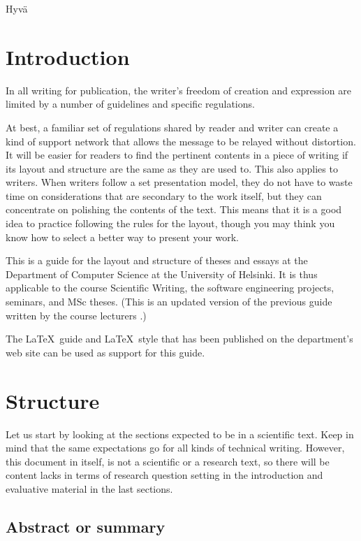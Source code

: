 Hyvä 
\chapter{Introduction}


In all writing for publication, the writer's freedom of creation and expression are limited by a number of guidelines and specific regulations.

At best, a familiar set of regulations shared by reader and writer can create a kind of support network that allows the message to be relayed without distortion. It will be easier for readers to find 
the pertinent contents in a piece of writing if its layout and structure are the same as they are used to. This also applies to writers. When writers follow a set presentation model, 
they do not have to waste time on considerations that are secondary to the work itself, but they can concentrate on polishing the contents of the text. This means that it is a good 
idea to practice following the rules for the layout, though you may think you know how to select a better way to present your work.

This is a guide for the layout and structure of theses and essays at the Department of Computer Science at the University of Helsinki. It is thus applicable to the course 
Scientific Writing, the software engineering projects, seminars, and MSc theses. (This is an updated version of 
the previous guide written by the course lecturers \citep{erkio01, erkiomakela96, erkio94, verkamo92}.)

The \LaTeX\ guide and \LaTeX\ style that has been  published on the department's web site can be used as support for this guide.


\chapter{Structure}

Let us start by looking at the sections expected to be in a scientific text. Keep in mind that the same expectations go for all kinds of technical writing.
However, this document in itself, is not a scientific or a research
text, so there will be content lacks in terms of research question
setting in the introduction and evaluative material in the last sections.

\section{Abstract or summary}



